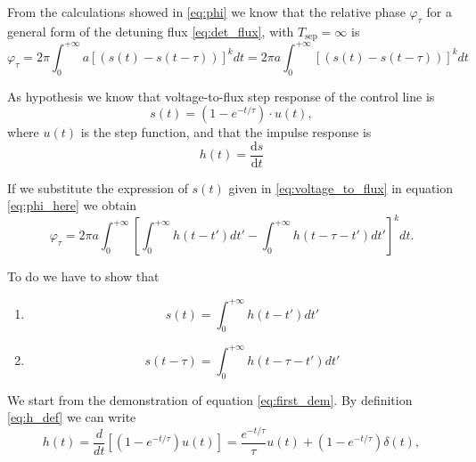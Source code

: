 From the calculations showed in \ref{eq:phi} we know that the relative phase $\varphi_\tau$ for a general form of the detuning flux \ref{eq:det_flux}, with $T_{\text{sep}} = \infty$ is
\begin{equation}\label{eq:phi_here}
    \varphi_{\tau} = 2\pi \int_{0}^{+\infty} a \left[ \left( s(t) - s(t - \tau) \right) \right]^k dt = 2\pi a \int_{0}^{+\infty} \left[ \left( s(t) - s(t - \tau) \right) \right]^k dt
\end{equation}

As hypothesis we know that voltage-to-flux step response of the control line is 
\begin{equation}\label{eq:voltage_to_flux}
    s(t) = \left(1 - e^{-t/\tau} \right) \cdot u(t),
\end{equation} where $u(t)$ is the step function, and that the impulse response is 
\begin{equation}\label{eq:h_def}
    h(t) = \frac{\text{d}s}{\text{d}t}
\end{equation}


If we substitute the expression of $s(t)$ given in \ref{eq:voltage_to_flux} in equation \ref{eq:phi_here} we obtain
\begin{equation}\label{eq:first_step_dem}
    \varphi_{\tau} = 2\pi a \int_{0}^{+\infty} \left[ \int_{0}^{+\infty} h(t - t') dt' - \int_{0}^{+\infty} h(t - \tau - t') dt' \right]^k dt.
\end{equation}

To do we have to show that \begin{enumerate}
    \item \begin{equation}\label{eq:first_dem}
        s(t) = \int_0^{+\infty} h(t-t')dt'
    \end{equation}
    \item \begin{equation}\label{eq:sec_dem}
        s(t-\tau) = \int_{0}^{+\infty} h(t-\tau-t')dt'
    \end{equation}
\end{enumerate}

We start from the demonstration of equation \ref{eq:first_dem}. By definition \ref{eq:h_def} we can write
\begin{equation}\label{eq:first_dem1}
    h(t) = \frac{d}{dt} \left[ \left(1 - e^{-t/\tau} \right) u(t) \right] = \frac{e^{-t/\tau}}{\tau} u(t) + \left(1 - e^{-t/\tau} \right) \delta(t), 
\end{equation}

